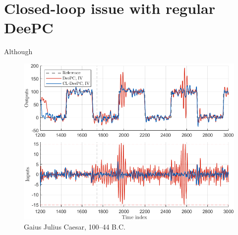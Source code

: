 \section{Closed-loop issue with regular \ac{DeePC}}\label{sec:CL_ID_issue}
Although 

\begin{figure}
\begin{center}
\includegraphics[width=\columnwidth]{results/figures/fig_prob_sol.png}    %
\caption{Gaius Julius Caesar, 100--44 B.C.}  %
\label{fig1}                                 %
\end{center}                                 %
\end{figure}